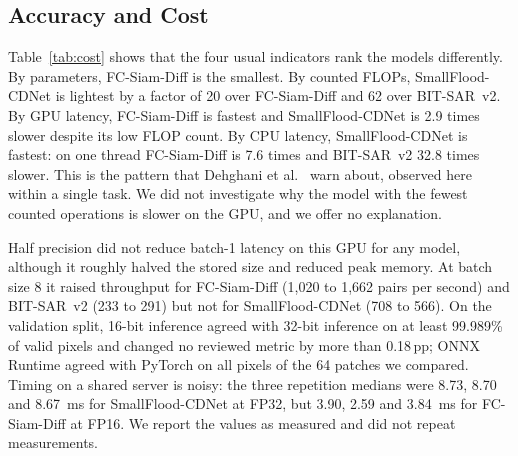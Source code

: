 \documentclass[runningheads]{llncs}
\newcommand{\pp}{\,pp}
\begin{document}
\subsection{Accuracy and Cost}
\label{sec:cost}

\begin{table}[t]
\centering
\caption{Cost for one pair of $256\times 256$ patches. FLOPs count convolutions and matrix
multiplications only. GPU: PyTorch on an RTX~A6000, batch 1, median latency at 32-bit (FP32) and 16-bit (FP16)
precision. CPU: ONNX Runtime on a Xeon Silver~4310, batch 1, median latency with one and
four threads. Size and peak memory are for 32-bit weights.}
\label{tab:cost}
\footnotesize\setlength{\tabcolsep}{3pt}
\end{table}

Table~\ref{tab:cost} shows that the four usual indicators rank the models differently.
By parameters, FC-Siam-Diff is the smallest. By counted FLOPs, SmallFlood-CDNet is lightest
by a factor of 20 over FC-Siam-Diff and 62 over BIT-SAR~v2. By GPU latency, FC-Siam-Diff is
fastest and SmallFlood-CDNet is 2.9 times slower despite its low FLOP count. By CPU latency,
SmallFlood-CDNet is fastest: on one thread FC-Siam-Diff is 7.6 times and BIT-SAR~v2 32.8 times
slower. This is the pattern that Dehghani et al.~\cite{dehghani2022efficiency} warn about,
observed here within a single task. We did not investigate why the model with the fewest
counted operations is slower on the GPU, and we offer no explanation.

Half precision did not reduce batch-1 latency on this GPU for any model, although it roughly
halved the stored size and reduced peak memory. At batch size 8 it raised throughput for
FC-Siam-Diff (1,020 to 1,662 pairs per second) and BIT-SAR~v2 (233 to 291) but not for
SmallFlood-CDNet (708 to 566). On the validation split, 16-bit inference
agreed with 32-bit inference on at least 99.989\% of valid pixels and changed no reviewed
metric by more than 0.18\pp{}; ONNX Runtime agreed with PyTorch on all pixels of the 64
patches we compared. Timing on a shared server is noisy: the three repetition medians were 8.73, 8.70 and
8.67~ms for SmallFlood-CDNet at FP32, but 3.90, 2.59 and 3.84~ms for FC-Siam-Diff at FP16.
We report the values as measured and did not repeat measurements.
\end{document}
